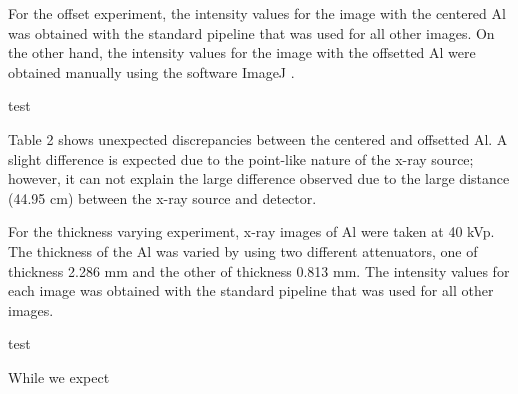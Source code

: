 For the offset experiment, the intensity values for the image with the centered Al was obtained with the standard pipeline that was used for all other images. On the other hand, the intensity values for the image with the offsetted Al were obtained manually using the software ImageJ \cite{ImageJ}.


\begin{table}[H]
    \small
    \noindent\makebox[\textwidth]{%
    
    }
    \caption{test}
\end{table}

Table 2 shows unexpected discrepancies between the centered and offsetted Al. A slight difference is expected due to the point-like nature of the x-ray source; however, it can not explain the large difference observed due to the large distance (44.95 cm) between the x-ray source and detector.


For the thickness varying experiment, x-ray images of Al were taken at 40 kVp. The thickness of the Al was varied by using two different attenuators, one of thickness 2.286 mm and the other of thickness 0.813 mm. The intensity values for each image was obtained with the standard pipeline that was used for all other images.

\begin{table}[H]
    \small
    \noindent\makebox[\textwidth]{%
    
    }
    \caption{test}
\end{table}

While we expect 














